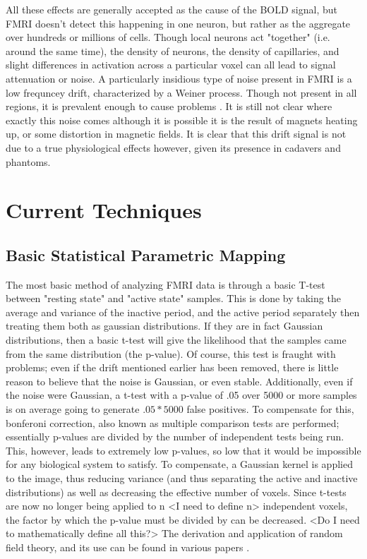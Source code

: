 \documentclass{article}
\begin{document}
All these effects are generally accepted as the cause of the BOLD signal, 
but FMRI doesn't detect this happening in one neuron, but rather as the 
aggregate over hundreds or millions of cells. Though local neurons act
"together" (i.e. around the same time), the density of neurons, the
density of capillaries, and slight differences in activation across 
a particular voxel can all lead to signal attenuation or noise. 
A particularly insidious type of noise present in FMRI is a low frequncey
drift, characterized by a Weiner process. Though not present in all
regions, it is prevalent enough to cause problems \cite{detrend}. It is still not
clear where exactly this noise comes although it is possible it is 
the result of magnets heating up, or some distortion in magnetic
fields. It is clear that this drift signal is not due to a true physiological
effects however, given its presence in cadavers and phantoms\cite{drift}.

\section*{Current Techniques}
\subsection*{Basic Statistical Parametric Mapping}
The most basic method of analyzing FMRI data is through a basic T-test
between "resting state" and "active state" samples. This is done by 
taking the average and variance of the inactive period, and the 
active period separately then treating them both as gaussian distributions.
If they are in fact Gaussian distributions, then a basic t-test will
give the likelihood that the samples came from the same distribution
(the p-value). Of course, this test is fraught with problems; even if
the drift mentioned earlier has been removed, there is little reason
to believe that the noise is Gaussian, or even stable. Additionally, 
even if the noise were Gaussian, a t-test with a p-value of .05 over
5000 or more samples is on average going to generate $.05*5000$ false
positives. To compensate for this, bonferoni correction, also known as
multiple comparison tests are performed; essentially p-values are 
divided by the number of independent
tests being run. This, however, leads to extremely low p-values, so
low that it would be impossible for any biological system to satisfy. To
compensate, a Gaussian kernel is applied to the image, thus reducing
variance (and thus separating the active and inactive distributions)
as well as decreasing the effective number of voxels. Since t-tests are
now no longer being applied to n <I need to define n> independent voxels,
the factor by which the p-value must be divided by can be decreased.
<Do I need to mathematically define all this?> The derivation and application
of random field theory, and its use can be found in various papers \cite{univ_mult_rft}.
\end{document}
